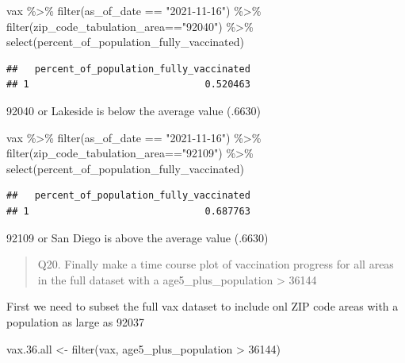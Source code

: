 \documentclass[
]{article}
\newenvironment{Shaded}{\begin{snugshade}}{\end{snugshade}}
\newcommand{\DecValTok}[1]{\textcolor[rgb]{0.00,0.00,0.81}{#1}}
\newcommand{\FloatTok}[1]{\textcolor[rgb]{0.00,0.00,0.81}{#1}}
\newcommand{\FunctionTok}[1]{\textcolor[rgb]{0.00,0.00,0.00}{#1}}
\newcommand{\NormalTok}[1]{#1}
\newcommand{\OtherTok}[1]{\textcolor[rgb]{0.56,0.35,0.01}{#1}}
\newcommand{\SpecialCharTok}[1]{\textcolor[rgb]{0.00,0.00,0.00}{#1}}
\newcommand{\StringTok}[1]{\textcolor[rgb]{0.31,0.60,0.02}{#1}}
\begin{document}
\begin{Shaded}
\begin{Highlighting}[]
\NormalTok{vax }\SpecialCharTok{\%\textgreater{}\%} \FunctionTok{filter}\NormalTok{(as\_of\_date }\SpecialCharTok{==} \StringTok{"2021{-}11{-}16"}\NormalTok{) }\SpecialCharTok{\%\textgreater{}\%}  
  \FunctionTok{filter}\NormalTok{(zip\_code\_tabulation\_area}\SpecialCharTok{==}\StringTok{"92040"}\NormalTok{) }\SpecialCharTok{\%\textgreater{}\%}
  \FunctionTok{select}\NormalTok{(percent\_of\_population\_fully\_vaccinated)}
\end{Highlighting}
\end{Shaded}

\begin{verbatim}
##   percent_of_population_fully_vaccinated
## 1                               0.520463
\end{verbatim}

92040 or Lakeside is below the average value (.6630)

\begin{Shaded}
\begin{Highlighting}[]
\NormalTok{vax }\SpecialCharTok{\%\textgreater{}\%} \FunctionTok{filter}\NormalTok{(as\_of\_date }\SpecialCharTok{==} \StringTok{"2021{-}11{-}16"}\NormalTok{) }\SpecialCharTok{\%\textgreater{}\%}  
  \FunctionTok{filter}\NormalTok{(zip\_code\_tabulation\_area}\SpecialCharTok{==}\StringTok{"92109"}\NormalTok{) }\SpecialCharTok{\%\textgreater{}\%}
  \FunctionTok{select}\NormalTok{(percent\_of\_population\_fully\_vaccinated)}
\end{Highlighting}
\end{Shaded}

\begin{verbatim}
##   percent_of_population_fully_vaccinated
## 1                               0.687763
\end{verbatim}

92109 or San Diego is above the average value (.6630)

\begin{quote}
Q20. Finally make a time course plot of vaccination progress for all
areas in the full dataset with a age5\_plus\_population \textgreater{}
36144
\end{quote}

First we need to subset the full vax dataset to include onl ZIP code
areas with a population as large as 92037

\begin{Shaded}
\begin{Highlighting}[]
\NormalTok{vax.}\FloatTok{36.}\NormalTok{all }\OtherTok{\textless{}{-}} \FunctionTok{filter}\NormalTok{(vax, age5\_plus\_population }\SpecialCharTok{\textgreater{}} \DecValTok{36144}\NormalTok{)}
\end{Highlighting}
\end{Shaded}
\end{document}
